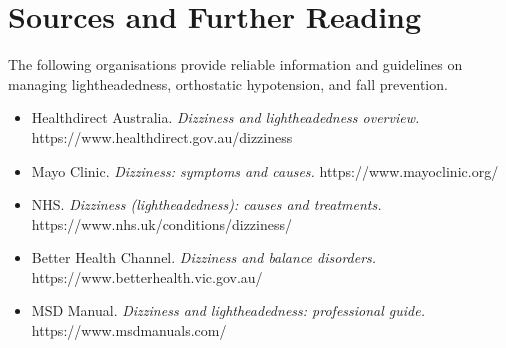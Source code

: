 \section*{Sources and Further Reading}
The following organisations provide reliable information and guidelines on managing lightheadedness, orthostatic hypotension, and fall prevention.
\begin{itemize}
    \item Healthdirect Australia. \textit{Dizziness and lightheadedness overview.} https://www.healthdirect.gov.au/dizziness
    \item Mayo Clinic. \textit{Dizziness: symptoms and causes.} https://www.mayoclinic.org/
    \item NHS. \textit{Dizziness (lightheadedness): causes and treatments.} https://www.nhs.uk/conditions/dizziness/
    \item Better Health Channel. \textit{Dizziness and balance disorders.} https://www.betterhealth.vic.gov.au/
    \item MSD Manual. \textit{Dizziness and lightheadedness: professional guide.} https://www.msdmanuals.com/
\end{itemize}
